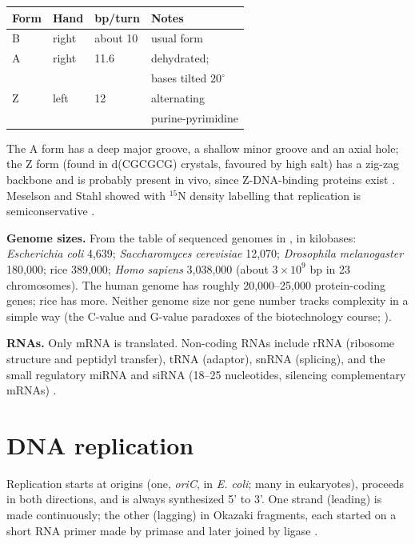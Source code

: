 \begin{center}
\begin{tabular}{llll}
Form & Hand & bp/turn & Notes \\
\hline
B & right & about 10 & usual form \\
A & right & 11.6 & dehydrated; \\
 & & & bases tilted $20^\circ$ \\
Z & left & 12 & alternating \\
 & & & purine-pyrimidine \\
\end{tabular}
\end{center}

The A form has a deep major groove, a shallow
minor groove and an axial hole; the Z form
(found in d(CGCGCG) crystals, favoured by
high salt) has a zig-zag backbone and is
probably present in vivo, since Z-DNA-binding
proteins exist \cite[Section
24-1]{voet2013fundamentals}. Meselson and
Stahl showed with $^{15}$N density labelling
that replication is semiconservative
\cite[Chapter 6]{alberts2014essential}.

\textbf{Genome sizes.}
From the table of sequenced genomes in
\cite[Section 3-4]{voet2013fundamentals}, in
kilobases: \emph{Escherichia coli} 4,639;
\emph{Saccharomyces cerevisiae} 12,070;
\emph{Drosophila melanogaster} 180,000; rice
389,000; \emph{Homo sapiens} 3,038,000 (about
$3 \times 10^9$ bp in 23 chromosomes). The
human genome has roughly 20,000--25,000
protein-coding genes; rice has more. Neither
genome size nor gene number tracks complexity
in a simple way (the C-value and G-value
paradoxes of the biotechnology course;
\cite[Chapter 5]{alberts2014essential}).

\textbf{RNAs.}
Only mRNA is translated. Non-coding RNAs
include rRNA (ribosome structure and peptidyl
transfer), tRNA (adaptor), snRNA (splicing),
and the small regulatory miRNA and siRNA
(18--25 nucleotides, silencing complementary
mRNAs) \cite[Chapter
28]{voet2013fundamentals}.

\section{DNA replication}
\label{section-mcb-replication}

Replication starts at origins (one,
\emph{oriC}, in \emph{E. coli}; many in
eukaryotes), proceeds in both directions, and
is always synthesized 5' to 3'. One strand
(leading) is made continuously; the other
(lagging) in Okazaki fragments, each started
on a short RNA primer made by primase and
later joined by ligase \cite[Chapter
6]{alberts2014essential}.

